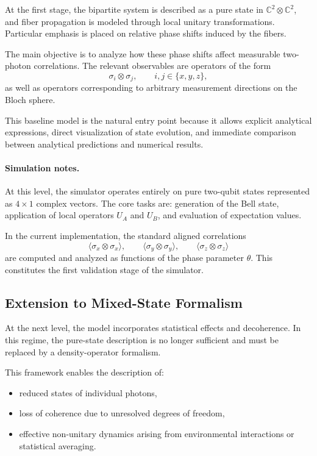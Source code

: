 \documentclass[a4paper]{article}
\begin{document}
At the first stage, the bipartite system is described as a pure state in \(\mathbb{C}^2 \otimes \mathbb{C}^2\), and fiber propagation is modeled through local unitary transformations. Particular emphasis is placed on relative phase shifts induced by the fibers.

The main objective is to analyze how these phase shifts affect measurable two-photon correlations. The relevant observables are operators of the form
\[
\sigma_i \otimes \sigma_j,
\qquad i,j \in \{x,y,z\},
\]
as well as operators corresponding to arbitrary measurement directions on the Bloch sphere.

This baseline model is the natural entry point because it allows explicit analytical expressions, direct visualization of state evolution, and immediate comparison between analytical predictions and numerical results.

\paragraph{Simulation notes.}
At this level, the simulator operates entirely on pure two-qubit states represented as \(4 \times 1\) complex vectors. The core tasks are: generation of the Bell state, application of local operators \(U_A\) and \(U_B\), and evaluation of expectation values.

In the current implementation, the standard aligned correlations
\[
\langle \sigma_x \otimes \sigma_x \rangle,\qquad
\langle \sigma_y \otimes \sigma_y \rangle,\qquad
\langle \sigma_z \otimes \sigma_z \rangle
\]
are computed and analyzed as functions of the phase parameter \(\theta\). This constitutes the first validation stage of the simulator.

\subsection{Extension to Mixed-State Formalism}

At the next level, the model incorporates statistical effects and decoherence. In this regime, the pure-state description is no longer sufficient and must be replaced by a density-operator formalism.

This framework enables the description of:
\begin{itemize}
    \item reduced states of individual photons,
    \item loss of coherence due to unresolved degrees of freedom,
    \item effective non-unitary dynamics arising from environmental interactions or statistical averaging.
\end{itemize}
\end{document}
